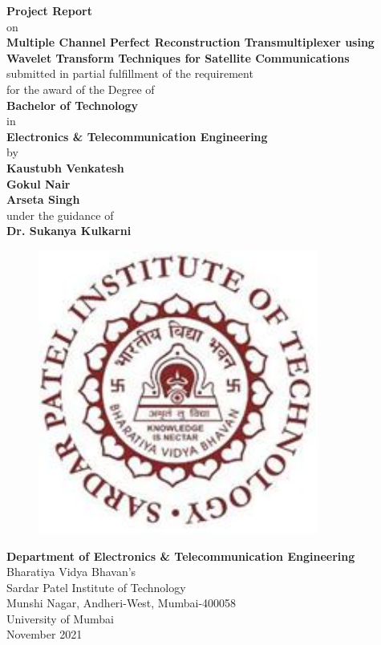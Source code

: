 \begin{titlepage}
\vspace*{0.25cm}
{\centering
\large
{\textbf {Project Report}} \\
on\\
{\Large\textbf {Multiple Channel Perfect Reconstruction Transmultiplexer using Wavelet Transform Techniques for Satellite Communications 
}}\\
\vspace{0.75cm}
submitted in partial fulfillment of the requirement\\
for the award of the Degree of\\\vspace{1cm}
{\large\textbf {Bachelor of Technology}}\\
in \\
{\large\textbf {Electronics \& Telecommunication Engineering}}\\
\vspace{0.5cm}
by\\
\vspace{0.5cm}
{\large \textbf {Kaustubh Venkatesh}}\\
{\large \textbf {Gokul Nair}}\\
{\large \textbf {Arseta Singh}}\\
\vspace{0.75cm} 
under the guidance of\\ 
\vspace{0.75cm}
\hspace{.05cm} {\large \textbf {Dr. Sukanya Kulkarni}}\\
\begin{figure}[h]
\centering
\includegraphics[scale=0.7]{spitlogo.pdf}
\end{figure}
\hspace{.05cm}
\hspace{.05cm}
\textbf {Department of Electronics \& Telecommunication Engineering}\\
Bharatiya  Vidya Bhavan's\\
Sardar Patel Institute of Technology\\
Munshi Nagar, Andheri-West, Mumbai-400058\\
University of Mumbai\\
\hspace{6.75cm}November 2021}\\
\end{titlepage}
\newpage

